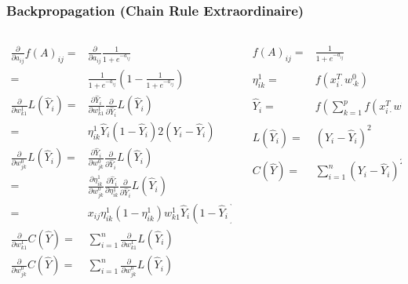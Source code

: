 \documentclass[xcolor={dvipsnames}]{beamer}
\begin{document}
\frame
{
 \frametitle{Backpropagation (Chain Rule Extraordinaire)}


\begin{columns}
\begin{column}{.7\textwidth}

\vspace{-1em}
\footnotesize

\begin{align*}
\frac{\partial}{\partial a_{ij}} f(A)_{ij} =& \frac{\partial}{\partial a_{ij}} \frac{1}{1+e^{-a_{ij}}}\\
=&  \frac{1}{1+e^{-a_{ij}}}  \left(1-\frac{1}{1+e^{-a_{ij}}}\right)  \\
\frac{\partial}{\partial w_{k1}^{1}} L(\hat Y_i) =& \frac{\partial \hat Y_i}{\partial w_{k1}^{1}}  \frac{\partial}{\partial \hat Y_i}    L(\hat Y_i) \\
=& \eta^1_{ik}\hat Y_i(1-\hat Y_i) 2(Y_i-\hat Y_i)\\
\frac{\partial}{\partial w_{jk}^{0}} L(\hat Y_i) =& \frac{\partial \hat Y_i}{\partial w_{jk}^{0}}  \frac{\partial}{\partial \hat Y_i}    L(\hat Y_i) \\
=& \frac{\partial \eta^1_{ik}}{\partial w_{jk}^{0}}   \frac{\partial \hat Y_i}{\partial \eta^1_{ik}}  \frac{\partial}{\partial \hat Y_i}    L(\hat Y_i) \\
=&  x_{ij} \eta^1_{ik}(1- \eta^1_{ik})  w^1_{k1} \hat Y_i(1-\hat Y_i) 2(Y_i-\hat Y_i)\\
\frac{\partial}{\partial w_{k1}^{1}} C(\hat Y) =& \sum_{i=1}^{n} \frac{\partial}{\partial w_{k1}^{1}} L(\hat Y_i)\\
\frac{\partial}{\partial w_{jk}^{0}} C(\hat Y) =& \sum_{i=1}^{n} \frac{\partial}{\partial w_{jk}^{0}} L(\hat Y_i)
\end{align*}
\end{column}

\begin{column}{.4\textwidth}
\vspace{-.65in}


\begin{align*}
f(A)_{ij} ={}& \frac{1}{1+e^{-a_{ij}}}\\
{}\\
\eta^1_{ik} ={}& f(x_{i\cdot}^T w^0_{\cdot k})\\
{}\\
\hat Y_i ={}& f  \left( \sum_{k=1}^p f(x_{i\cdot}^T w^0_{\cdot k}) w^1_{k1} \right)\\
{}\\
L(\hat Y_i) ={}& (Y_i - \hat Y_i)^2\\
{}\\
C(\hat Y) ={}& \sum_{i=1}^n (Y_i - \hat Y_i)^2
\end{align*}

\end{column}

\end{columns}


}
\end{document}
